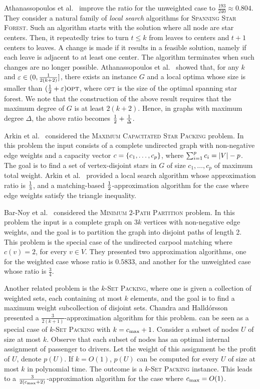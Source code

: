 Athanassopoulos et al.~\cite{ACKK09} improve the ratio for the
unweighted case to $\frac{193}{240} \approx 0.804$.
%
They consider a natural family of \emph{local search} algorithms
for \textsc{Spanning Star Forest}.  Such an algorithm starts with the
solution where all node are star centers.  Then, it repeatedly tries
to turn $t \leq k$ from leaves to centers and $t+1$ centers to leaves.
A change is made if it results in a feasible solution, namely if each
leave is adjacent to at least one center.  The algorithm terminates
when such changes are no longer possible.
%
Athanassopoulos et al.~\cite{ACKK09} showed that, for any $k$ and
$\varepsilon \in (0,\frac{1}{2(k+2)}]$, there exists an instance $G$ and a local
optima whose size is smaller than $(\frac{1}{2} + \varepsilon) \textsc{opt}$,
where \textsc{opt} is the size of the optimal spanning star forest.
We note that the construction of the above result requires that the
maximum degree of $G$ is at least $2(k+2)$.  Hence, in graphs with
maximum degree $\Delta$, the above ratio becomes $\frac{1}{2}
+ \frac{1}{\Delta}$.

Arkin et al.~\cite{arkin2004approximations} considered
the \textsc{Maximum Capacitated Star Packing} problem.  In this
problem the input consists of a complete undirected graph with
non-negative edge weights and a capacity vector $c
= \left\{ c_1,\ldots,c_p \right\}$, where $\sum_{i=1}^p c_i = \left| V \right| - p$.  The
goal is to find a set of vertex-disjoint stars in $G$ of size
$c_1,\ldots,c_p$ of maximum total weight.  Arkin et
al.~\cite{arkin2004approximations} provided a local search algorithm
whose approximation ratio is $\frac{1}{3}$, and a matching-based
$\frac{1}{2}$-approximation algorithm for the case where edge weights
satisfy the triangle inequality.

Bar-Noy et al.~\cite{bar2015improved} considered the
\textsc{Minimum $2$-Path Partition} problem.
In this problem the input is a complete graph on $3k$ vertices with
non-negative edge weights, and the goal is to partition the graph into
disjoint paths of length 2.  This problem is the special case of the
undirected carpool matching where $c(v) = 2$, for every $v \in V$.
They presented two approximation algorithms, one for the weighted case
whose ratio is $0.5833$, and another for the unweighted case whose
ratio is $\frac{3}{4}$.

Another related problem is the \textsc{$k$-Set Packing}, where one is
given a collection of weighted sets, each containing at most $k$
elements, and the goal is to find a maximum weight subcollection of
disjoint sets.  Chandra and Halld\'orsson~\cite{chandra2001greedy}
presented a $\frac{3}{2(k+1)}$-approximation algorithm for this
problem.
%
\carpool can be seen as a special case of \textsc{$k$-Set Packing}
with $k = c_{\max} + 1$.  Consider a subset of nodes $U$ of size at most
$k$.  Observe that each subset of nodes has an optimal internal
assignment of passenger to drivers.  Let the weight of this assignment
be the profit of $U$, denote $p(U)$.  If $k = O(1)$, $p(U)$ can be
computed for every $U$ of size at most $k$ in polynomial time.  The
outcome is a \textsc{$k$-Set Packing} instance.  This leads to a
$\frac{3}{2(c_{\max}+2)}$-approximation algorithm for the case where
$c_{\max} = O(1)$.


